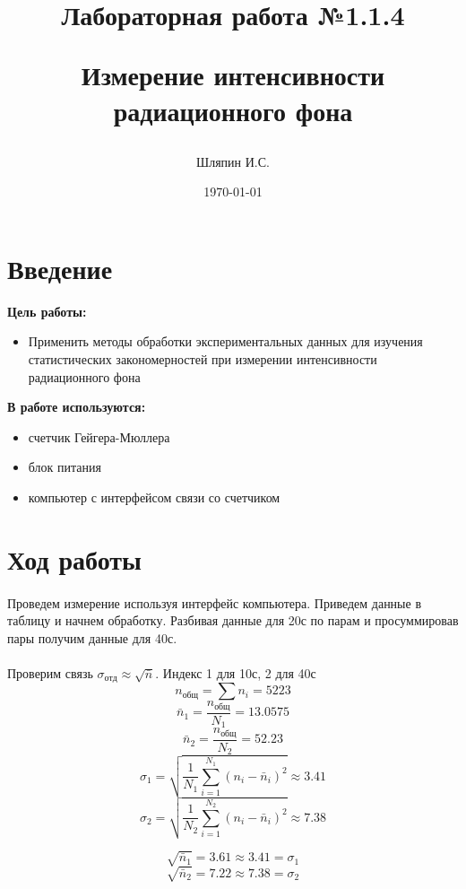 \documentclass[a4paper, 12pt]{article}
\title{\begin{center}Лабораторная работа №1.1.4\end{center}
Измерение интенсивности радиационного фона}
\author{Шляпин И.С.}
\date{\today}
\begin{document}
    \maketitle
    \newpage

    \section{Введение}
    \textbf{Цель работы:}
    \begin{itemize}
        \item Применить методы обработки экспериментальных данных для изучения статистических закономерностей при измерении интенсивности радиационного фона
    \end{itemize}

    \vspace{1cm}

    \textbf{В работе используются: }
    \begin{itemize}
        \item счетчик Гейгера-Мюллера
        \item блок питания
        \item компьютер с интерфейсом связи со счетчиком

    \end{itemize}

    \section{Ход работы}
    \paragraph{}
    Проведем измерение используя интерфейс компьютера. Приведем данные в таблицу и начнем  обработку. Разбивая данные для 20с по парам и просуммировав пары получим данные для 40с.
    \paragraph{}
    Проверим связь $\sigma_{отд}\approx \sqrt{\bar{n}}$. Индекс 1 для 10с, 2 для 40с
    \[n_{общ} = \sum n_i = 5223\]
    \[\bar{n}_1 = \frac{n_{общ}}{N_1} = 13.0575\]
    \[\bar{n}_2 = \frac{n_{общ}}{N_2} = 52.23\]
    \[\sigma_{1}=\sqrt{\frac{1}{N_1} \sum_{i=1}^{N_1} (n_i - \bar{n}_i)^2} \approx 3.41\]
    \[\sigma_{2}=\sqrt{\frac{1}{N_2} \sum_{i=1}^{N_2} (n_i - \bar{n}_i)^2} \approx 7.38\]
    \newpage

    \[\sqrt{\bar{n}_1} =3.61 \approx 3.41 = \sigma_1\]
    \[\sqrt{\bar{n}_2} =7.22 \approx 7.38 = \sigma_2\]
\end{document}
